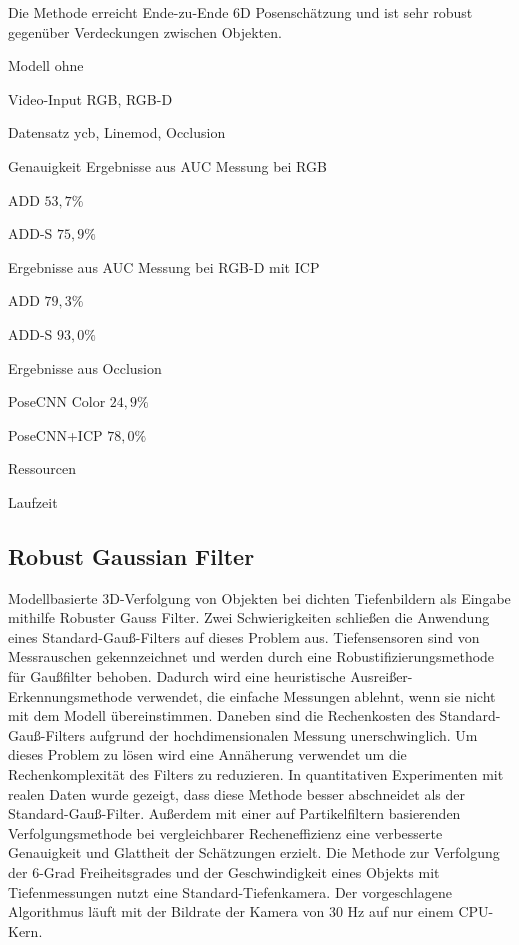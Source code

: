 \documentclass[a4paper, 11pt]{article}
\begin{document}
\begin{multicols*}{2}
    Die Methode erreicht Ende-zu-Ende 6D Posenschätzung und ist sehr robust gegenüber Verdeckungen zwischen Objekten.
    \begin{description*}
        \item[Modell] ohne
        \item[Video-Input] RGB, RGB-D
        \item[Datensatz] \Gls{ycb}, \Gls{Linemod}, \Gls{Occlusion}
        \item[Genauigkeit] Ergebnisse aus \Gls{AUC} Messung bei RGB
        \begin{itemize*}
            \item ADD $53,7\%$
            \item ADD-S $75,9\%$
        \end{itemize*}
        Ergebnisse aus \Gls{AUC} Messung bei RGB-D mit ICP
        \begin{itemize*}
            \item ADD $79,3\%$
            \item ADD-S $93,0\%$
        \end{itemize*}
        Ergebnisse aus \Gls{Occlusion}
        \begin{itemize*}
            \item PoseCNN Color $24,9\%$
            \item PoseCNN+ICP $78,0\%$
        \end{itemize*}
        \item[Ressourcen]
        \item[Laufzeit]
    \end{description*}

    \subsection{Robust Gaussian Filter}
    Modellbasierte 3D-Verfolgung von Objekten bei dichten Tiefenbildern als Eingabe mithilfe Robuster Gauss Filter\cite{GaussianFilter}.
    Zwei Schwierigkeiten schließen die Anwendung eines Standard-Gauß-Filters auf dieses Problem aus. Tiefensensoren sind von Messrauschen gekennzeichnet und werden durch eine Robustifizierungsmethode für Gaußfilter behoben. Dadurch wird eine heuristische Ausreißer-Erkennungsmethode verwendet, die einfache Messungen ablehnt, wenn sie nicht mit dem Modell übereinstimmen.
    Daneben sind die Rechenkosten des Standard-Gauß-Filters aufgrund der hochdimensionalen Messung unerschwinglich. Um dieses Problem zu lösen wird eine Annäherung verwendet um die Rechenkomplexität des Filters zu reduzieren.
    In quantitativen Experimenten mit realen Daten wurde gezeigt, dass diese Methode besser abschneidet als der Standard-Gauß-Filter. Außerdem mit einer auf Partikelfiltern basierenden Verfolgungsmethode bei vergleichbarer Recheneffizienz eine verbesserte Genauigkeit und Glattheit der Schätzungen erzielt.
    Die Methode zur Verfolgung der 6-Grad Freiheitsgrades und der Geschwindigkeit eines Objekts mit Tiefenmessungen nutzt eine Standard-Tiefenkamera. Der vorgeschlagene Algorithmus läuft mit der Bildrate der Kamera von 30 Hz auf nur einem CPU-Kern.


\end{multicols*}
\end{document}
